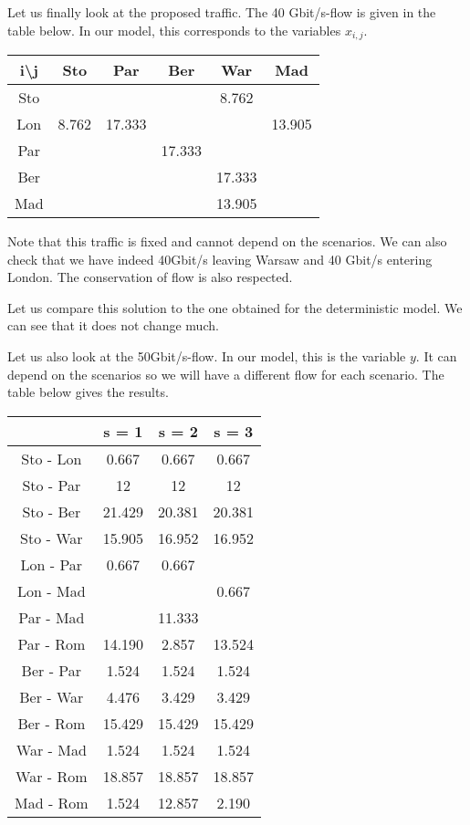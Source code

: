 Let us finally look at the proposed traffic. The 40 Gbit/s-flow is given in the table below. In our model, this corresponds to the variables $x_{i,j}$.
\begin{center}
\begin{tabular}{|c|c|c|c|c|c|}
\hline 
i\textbackslash j & Sto & Par & Ber & War & Mad \\ 
\hline 
Sto &  &  &  & 8.762 &  \\ 
\hline 
Lon & 8.762 & 17.333 &  &  & 13.905 \\ 
\hline 
Par &  &  & 17.333 &  &  \\ 
\hline 
Ber &  &  &  & 17.333 &  \\ 
\hline 
Mad &  &  &  & 13.905 &  \\ 
\hline 
\end{tabular} 
\end{center}

Note that this traffic is fixed and cannot depend on the scenarios. We can also check that we have indeed 40Gbit/s leaving Warsaw and 40 Gbit/s entering London. The conservation of flow is also respected. 

Let us compare this solution to the one obtained for the deterministic model. We can see that it does not change much. 

Let us also look at the 50Gbit/s-flow. In our model, this is the variable $y$. It can depend on the scenarios so we will have a different flow for each scenario. The table below gives the results.

\begin{center}
\begin{tabular}{|c|c|c|c|}
\hline 
 & s = 1 & s = 2 & s = 3 \\ 
\hline 
Sto - Lon & 0.667 & 0.667 & 0.667 \\ 
\hline 
Sto - Par & 12 & 12 & 12 \\ 
\hline 
Sto - Ber & 21.429 & 20.381 & 20.381 \\ 
\hline 
Sto - War & 15.905 & 16.952 & 16.952 \\ 
\hline 
Lon - Par & 0.667 & 0.667 &  \\ 
\hline 
Lon - Mad &  &  & 0.667 \\ 
\hline 
Par - Mad &  & 11.333 &  \\ 
\hline 
Par - Rom & 14.190 & 2.857 & 13.524 \\ 
\hline 
Ber - Par & 1.524 & 1.524 & 1.524 \\ 
\hline 
Ber - War & 4.476 & 3.429 & 3.429 \\ 
\hline 
Ber - Rom & 15.429 & 15.429 & 15.429 \\ 
\hline 
War - Mad & 1.524 & 1.524 & 1.524 \\ 
\hline 
War - Rom & 18.857 & 18.857 & 18.857 \\ 
\hline 
Mad - Rom & 1.524 & 12.857 & 2.190 \\ 
\hline 
\end{tabular} 
\end{center}

